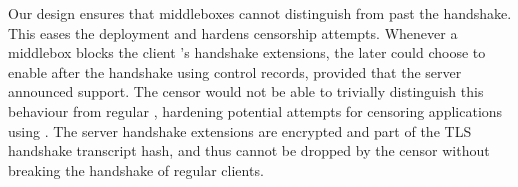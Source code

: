 Our design ensures that middleboxes cannot distinguish \tcpls from \tls past the
handshake. This eases the \tcpls deployment and hardens censorship attempts.
Whenever a middlebox blocks the client \tcpls's handshake extensions, the later
could choose to enable \tcpls after the handshake using \tcpls control records,
provided that the server announced \tcpls support.  The censor would not be able
to trivially distinguish this behaviour from regular \tls, hardening potential
attempts for censoring applications using \tcpls. The server handshake
extensions are encrypted and part of the TLS handshake transcript hash,  and thus
cannot be dropped by the censor without breaking the handshake of regular \tls
clients.








